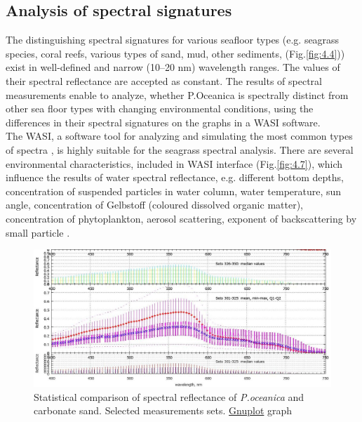 \documentclass[11pt]{article}
\begin{document}
\subsection{Analysis of spectral signatures}
The distinguishing spectral signatures for various seafloor types (e.g. seagrass species, coral reefs,
various types of sand, mud, other sediments, (Fig.\ref{fig:4.4})) exist in well-defined and narrow (10–20 nm)
wavelength ranges. 
The values of their spectral reflectance are accepted as constant. The results of
spectral measurements enable to analyze, whether P.Oceanica is spectrally distinct from other sea
floor types with changing environmental conditions, using the differences in their spectral signatures
on the graphs in a \ac{WASI} software. \\The \ac{WASI}, a
software tool for analyzing and simulating the most common types of spectra \cite{Gege05}\label{Gege05}, is highly
suitable for the seagrass spectral analysis.
There are several environmental characteristics, included in \ac{WASI} interface (Fig.\ref{fig:4.7}), which influence the
results of water spectral reflectance, e.g. different bottom depths, concentration of suspended particles
in water column, water temperature, sun angle, concentration of Gelbstoff (coloured dissolved organic
matter), concentration of phytoplankton, aerosol scattering, exponent of backscattering by small
particle \cite{Gege04}\label{Gege04}. 

\begin{figure}[H]
	\centering
	\includegraphics[scale=0.35]{GNU-20-new.jpg}
	\caption{Statistical comparison of spectral reflectance of \textit{P.oceanica} and carbonate sand. Selected measurements sets. \href{http://www.gnuplot.info/}{Gnuplot} graph}
	\label{fig:28}
\end{figure}
\end{document}
